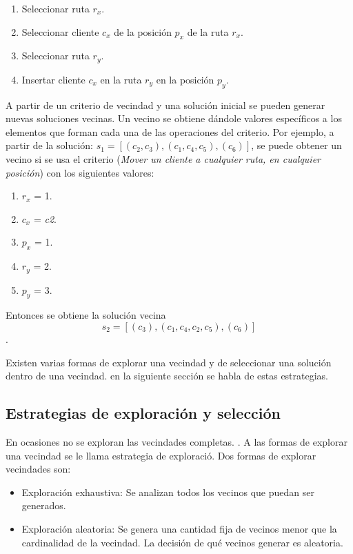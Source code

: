\begin{enumerate}
	\item Seleccionar ruta \textbf{$r_x$}.
	\item Seleccionar cliente \textbf{$c_x$} de la posición \textbf{$p_x$} de la ruta \textbf{$r_x$}.
	\item Seleccionar ruta \textbf{$r_y$}.
	\item Insertar cliente \textbf{$c_x$} en la ruta \textbf{$r_y$} en la posición \textbf{$p_y$}.
\end{enumerate}

A partir de un criterio de vecindad y una solución inicial se pueden generar nuevas soluciones vecinas. Un vecino se obtiene dándole valores específicos a los elementos que forman cada una de las operaciones del criterio. Por ejemplo, a partir de la solución: $s_1 = [(c_2,c_3), (c_1,c_4,c_5), (c_6)]$, se puede obtener un vecino si se usa el criterio (\textit{Mover un cliente a cualquier ruta, en cualquier posición}) con los siguientes valores:

\begin{enumerate}
	\item \textbf{$r_x$} = 1.
	\item \textbf{$c_x$} = \textit{c2}.
	\item \textbf{$p_x$} = 1.
	\item \textbf{$r_y$} = 2.
	\item \textbf{$p_y$} = 3. 
\end{enumerate}

Entonces se obtiene la solución vecina $$s_2 = [(c_3), (c_1,c_4,c_2, c_5), (c_6)]$$.

Existen varias formas de explorar una vecindad y de seleccionar una solución dentro de una vecindad. en la siguiente sección se habla de estas estrategias.

\subsection{Estrategias de exploración y selección}
En ocasiones no se exploran las vecindades completas. \cite{Alina2017}\cite{Heidy}. A las formas de explorar una vecindad se le llama estrategia de exploració. Dos formas de explorar vecindades son:

\begin{itemize}
	\item Exploración exhaustiva: Se analizan todos los vecinos que puedan ser generados.
	\item Exploración aleatoria: Se genera una cantidad fija de vecinos menor que la cardinalidad de la vecindad. La decisión de qué vecinos generar es aleatoria.
\end{itemize}

